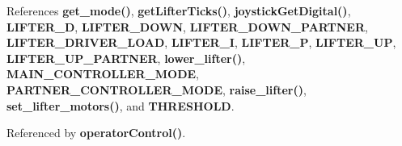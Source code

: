 References \textbf{ get\+\_\+mode()}, \textbf{ get\+Lifter\+Ticks()}, \textbf{ joystick\+Get\+Digital()}, \textbf{ L\+I\+F\+T\+E\+R\+\_\+D}, \textbf{ L\+I\+F\+T\+E\+R\+\_\+\+D\+O\+WN}, \textbf{ L\+I\+F\+T\+E\+R\+\_\+\+D\+O\+W\+N\+\_\+\+P\+A\+R\+T\+N\+ER}, \textbf{ L\+I\+F\+T\+E\+R\+\_\+\+D\+R\+I\+V\+E\+R\+\_\+\+L\+O\+AD}, \textbf{ L\+I\+F\+T\+E\+R\+\_\+I}, \textbf{ L\+I\+F\+T\+E\+R\+\_\+P}, \textbf{ L\+I\+F\+T\+E\+R\+\_\+\+UP}, \textbf{ L\+I\+F\+T\+E\+R\+\_\+\+U\+P\+\_\+\+P\+A\+R\+T\+N\+ER}, \textbf{ lower\+\_\+lifter()}, \textbf{ M\+A\+I\+N\+\_\+\+C\+O\+N\+T\+R\+O\+L\+L\+E\+R\+\_\+\+M\+O\+DE}, \textbf{ P\+A\+R\+T\+N\+E\+R\+\_\+\+C\+O\+N\+T\+R\+O\+L\+L\+E\+R\+\_\+\+M\+O\+DE}, \textbf{ raise\+\_\+lifter()}, \textbf{ set\+\_\+lifter\+\_\+motors()}, and \textbf{ T\+H\+R\+E\+S\+H\+O\+LD}.



Referenced by \textbf{ operator\+Control()}.


